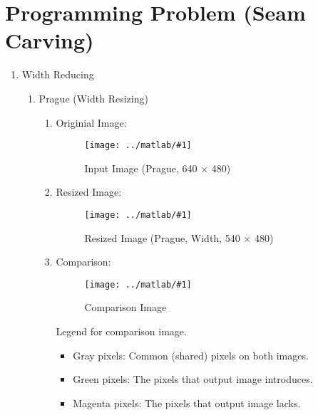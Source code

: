 \documentclass{article}
\newcommand{\listFigure}[3]{
	\begin{figure}[H]
		\texttt{[image: ../matlab/\#1]}
		\caption{#2\label{fig:#3}}
	\end{figure}		
}
\begin{document}
\label{Programming Problem (Seam Carving)}
\section{Programming Problem (Seam Carving)}
\begin{enumerate}
	\label{Answer 1}
	\item Width Reducing
	
	\begin{enumerate} 
		\item Prague (Width Resizing) \\
		\begin{enumerate}
			\item Originial Image: \\
			\listFigure{inputSeamCarvingPrague.jpg}{Input Image (Prague, 640 $\times$
			480)}{inputSeamCarvingPrague}
			\pagebreak
			\item Resized Image: \\
			\listFigure{outputReduceWidthPrague.png}{Resized Image (Prague, Width, 540 $\times$ 480)}{outputReduceWidthPrague}
			\pagebreak
			\item Comparison: \\
			\listFigure{outputReduceWidthInputvsDynamicPrague.png}{Comparison
			Image}{outputReduceWidthInputvsDynamicPrague}
			Legend for comparison image.
			\begin{itemize}
				\item Gray pixels: Common (shared) pixels on both images.
				\item Green pixels: The pixels that output image introduces.
				\item Magenta pixels: The pixels that output image lacks.
			\end{itemize}
		\end{enumerate}
		

\end{enumerate}
\end{enumerate}
\end{document}
